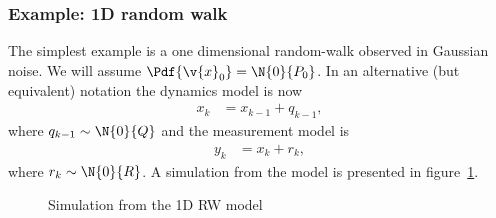 \parencite{Murphy2002}
\subsubsection*{Example: 1D random walk}
The simplest example is a one dimensional random-walk observed in Gaussian noise.
We will assume $\Pdf{\v{x}_0}=\N{0}{P_0}$. In an alternative (but equivalent) notation
the dynamics model is now
\begin{align}
	x_k&=x_{k-1}+q_{k-1},
\end{align}
where $q_{k-1}\sim \N{0}{Q}$ and the measurement model is
\begin{align}
	y_k&=x_{k}+r_{k},
\end{align}
where $r_{k}\sim \N{0}{R}$. A simulation from the model is presented in figure~\ref{fig:rw1d}.

\begin{figure}[htp]
\begin{center}
  \caption{Simulation from the 1D RW model}
  \label{fig:rw1d}
\end{center}
\end{figure}
